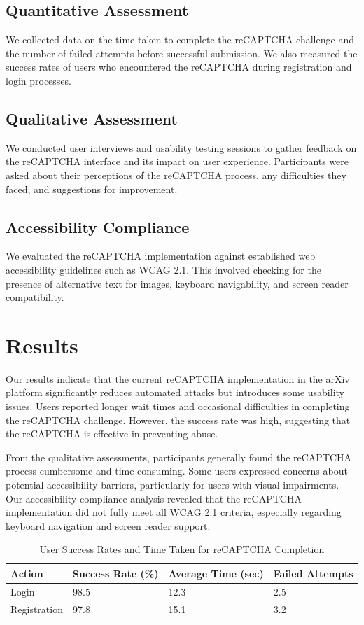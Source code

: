 \documentclass{article}
\begin{document}
\subsection{Quantitative Assessment}
We collected data on the time taken to complete the reCAPTCHA challenge and the number of failed attempts before successful submission. We also measured the success rates of users who encountered the reCAPTCHA during registration and login processes.

\subsection{Qualitative Assessment}
We conducted user interviews and usability testing sessions to gather feedback on the reCAPTCHA interface and its impact on user experience. Participants were asked about their perceptions of the reCAPTCHA process, any difficulties they faced, and suggestions for improvement.

\subsection{Accessibility Compliance}
We evaluated the reCAPTCHA implementation against established web accessibility guidelines such as WCAG 2.1. This involved checking for the presence of alternative text for images, keyboard navigability, and screen reader compatibility.

\section{Results}
Our results indicate that the current reCAPTCHA implementation in the arXiv platform significantly reduces automated attacks but introduces some usability issues. Users reported longer wait times and occasional difficulties in completing the reCAPTCHA challenge. However, the success rate was high, suggesting that the reCAPTCHA is effective in preventing abuse.

From the qualitative assessments, participants generally found the reCAPTCHA process cumbersome and time-consuming. Some users expressed concerns about potential accessibility barriers, particularly for users with visual impairments. Our accessibility compliance analysis revealed that the reCAPTCHA implementation did not fully meet all WCAG 2.1 criteria, especially regarding keyboard navigation and screen reader support.

\begin{table}[ht]
\centering
\caption{User Success Rates and Time Taken for reCAPTCHA Completion}
\label{tab:user_success}
\begin{tabular}{@{}llll@{}}
\toprule
\textbf{Action} & \textbf{Success Rate (\%)} & \textbf{Average Time (sec)} & \textbf{Failed Attempts} \\ \midrule
Login & 98.5 & 12.3 & 2.5 \\
Registration & 97.8 & 15.1 & 3.2 \\ \bottomrule
\end{tabular}
\end{table}
\end{document}

